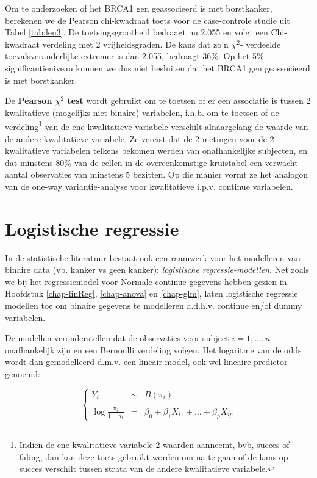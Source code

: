 \documentclass[
  12pt,dutch,coursenotes]{book}
\begin{document}
Om te onderzoeken of het BRCA1 gen geassocieerd is met borstkanker, berekenen we de Pearson chi-kwadraat toets voor de case-controle studie uit Tabel \ref{tab:leu3}. De toetsingsgrootheid bedraagt nu 2.055 en volgt een Chi-kwadraat verdeling met 2 vrijheidsgraden. De kans dat zo'n \(\chi^2\)- verdeelde toevalsveranderlijke extremer is dan 2.055, bedraagt 36\%.
Op het 5\% significantieniveau kunnen we dus niet besluiten dat het BRCA1 gen geassocieerd is met borstkanker.

De \textbf{Pearson \(\chi^2\) test} wordt gebruikt om te toetsen of er een associatie is tussen 2 kwalitatieve (mogelijks niet binaire) variabelen, i.h.b. om te toetsen of de verdeling\footnote{Indien de ene kwalitatieve variabele 2 waarden aanneemt, bvb, succes of faling, dan kan deze toets gebruikt worden om na te gaan of de kans op succes verschilt tussen strata van de andere kwalitatieve variabele.} van de ene kwalitatieve variabele verschilt alnaargelang de waarde van de andere kwalitatieve variabele. Ze vereist dat de 2 metingen voor de 2 kwalitatieve variabelen telkens bekomen werden van onafhankelijke subjecten, en dat minstens 80\% van de cellen in de overeenkomstige kruistabel een verwacht aantal observaties van minstens 5 bezitten. Op die manier vormt ze het analogon van de one-way variantie-analyse voor kwalitatieve i.p.v. continue variabelen.

\hypertarget{logistische-regressie}{%
\section{Logistische regressie}\label{logistische-regressie}}

In de statistische literatuur bestaat ook een raamwerk voor het modelleren van binaire data (vb. kanker vs geen kanker): \emph{logistische regressie-modellen}.
Net zoals we bij het regressiemodel voor Normale continue gegevens hebben gezien in Hoofdstuk \ref{chap-linReg}, \ref{chap-anova} en \ref{chap-glm}, laten logistische regressie modellen toe om binaire gegevens te modelleren a.d.h.v. continue en/of dummy variabelen.

De modellen veronderstellen dat de observaties voor subject \(i=1,\ldots,n\) onafhankelijk zijn en een Bernoulli verdeling volgen. Het logaritme van de odds wordt dan gemodelleerd d.m.v. een lineair model, ook wel lineaire predictor genoemd:

\begin{equation}
\left\{
\begin{array}{ccl}
Y_i&\sim&B(\pi_i)\\\\
\log \frac{\pi_i}{1-\pi_i}&=&\beta_0 + \beta_1X_{i1} + \ldots + \beta_p X_{ip}
\end{array}\right.
\end{equation}
\end{document}
